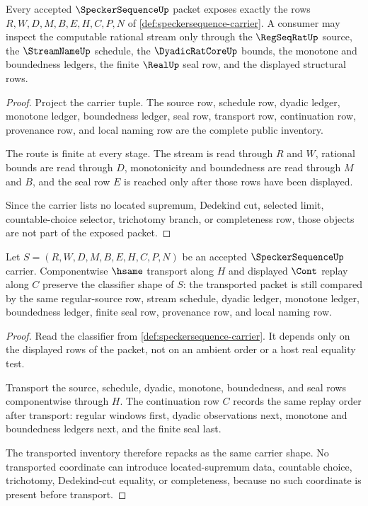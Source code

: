 \begin{theorem}
\label{thm:speckersequence-carrier-exposure}
Every accepted $\SpeckerSequenceUp$ packet exposes exactly the rows $R,W,D,M,B,E,H,C,P,N$ of \autoref{def:speckersequence-carrier}. A consumer may inspect the computable rational stream only through the $\RegSeqRatUp$ source, the $\StreamNameUp$ schedule, the $\DyadicRatCoreUp$ bounds, the monotone and boundedness ledgers, the finite $\RealUp$ seal row, and the displayed structural rows.
\end{theorem}
\begin{proof}
Project the carrier tuple. The source row, schedule row, dyadic ledger, monotone ledger, boundedness ledger, seal row, transport row, continuation row, provenance row, and local naming row are the complete public inventory.

The route is finite at every stage. The stream is read through $R$ and $W$, rational bounds are read through $D$, monotonicity and boundedness are read through $M$ and $B$, and the seal row $E$ is reached only after those rows have been displayed.

Since the carrier lists no located supremum, Dedekind cut, selected limit, countable-choice selector, trichotomy branch, or completeness row, those objects are not part of the exposed packet.
\end{proof}

\begin{theorem}
\label{thm:speckersequence-classifier-transport}
Let $S=(R,W,D,M,B,E,H,C,P,N)$ be an accepted $\SpeckerSequenceUp$ carrier. Componentwise $\hsame$ transport along $H$ and displayed $\Cont$ replay along $C$ preserve the classifier shape of $S$: the transported packet is still compared by the same regular-source row, stream schedule, dyadic ledger, monotone ledger, boundedness ledger, finite seal row, provenance row, and local naming row.
\end{theorem}
\begin{proof}
Read the classifier from \autoref{def:speckersequence-carrier}. It depends only on the displayed rows of the packet, not on an ambient order or a host real equality test.

Transport the source, schedule, dyadic, monotone, boundedness, and seal rows componentwise through $H$. The continuation row $C$ records the same replay order after transport: regular windows first, dyadic observations next, monotone and boundedness ledgers next, and the finite seal last.

The transported inventory therefore repacks as the same carrier shape. No transported coordinate can introduce located-supremum data, countable choice, trichotomy, Dedekind-cut equality, or completeness, because no such coordinate is present before transport.
\end{proof}

